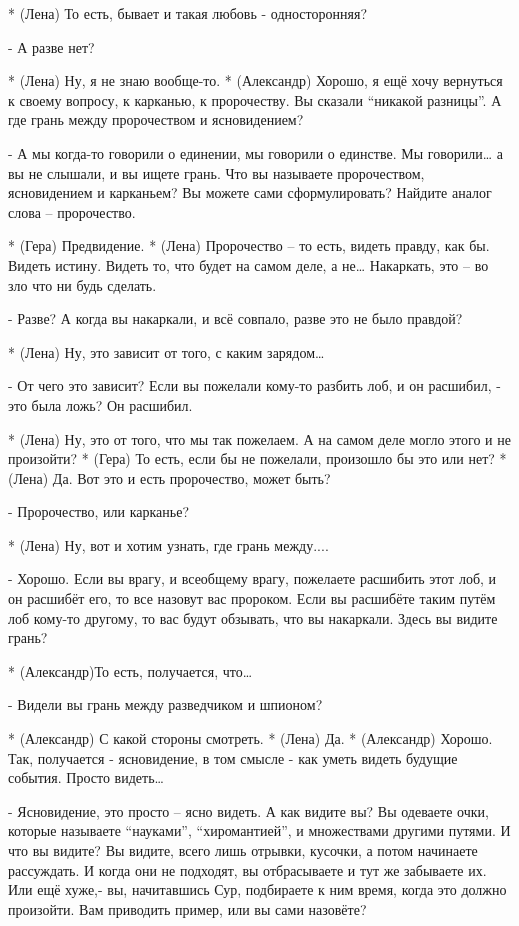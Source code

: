 * (Лена) То есть, бывает и такая любовь - односторонняя?

- А разве нет?

* (Лена) Ну, я не знаю вообще-то.
* (Александр) Хорошо, я ещё хочу вернуться к своему вопросу, к карканью, к пророчеству. Вы сказали “никакой разницы”. А где грань между пророчеством и ясновидением?

- А мы когда-то говорили о единении, мы говорили о единстве. Мы говорили… а вы не слышали, и вы ищете грань. Что вы называете пророчеством, ясновидением и карканьем? Вы можете сами сформулировать? Найдите аналог слова – пророчество.

* (Гера) Предвидение.
* (Лена) Пророчество – то есть, видеть правду, как бы. Видеть истину. Видеть то, что будет на самом деле, а не… Накаркать, это – во зло что ни будь сделать.

- Разве? А когда вы накаркали, и всё совпало, разве это не было правдой?

* (Лена) Ну, это зависит от того, с каким зарядом…

- От чего это зависит? Если вы пожелали кому-то разбить лоб, и он расшибил, - это была ложь? Он расшибил.

* (Лена) Ну, это от того, что мы так пожелаем. А на самом деле могло этого и не произойти?
* (Гера) То есть, если бы не пожелали, произошло бы это или нет?
* (Лена) Да. Вот это и есть пророчество, может быть?

- Пророчество, или карканье?

* (Лена) Ну, вот и хотим узнать, где грань между....

- Хорошо. Если вы врагу, и всеобщему врагу, пожелаете расшибить этот лоб, и он расшибёт его, то все назовут вас пророком. Если вы расшибёте таким путём лоб кому-то другому, то вас будут обзывать, что вы накаркали. Здесь вы видите грань?

* (Александр)То есть, получается, что…

- Видели вы грань между разведчиком и шпионом?

* (Александр) С какой стороны смотреть.
* (Лена) Да.  
* (Александр) Хорошо. Так, получается - ясновидение, в том смысле - как уметь видеть будущие события. Просто видеть…

- Ясновидение, это просто – ясно видеть.  А как видите вы? Вы одеваете очки, которые называете “науками”, “хиромантией”, и множествами другими путями. И что вы видите? Вы видите, всего лишь отрывки, кусочки, а потом начинаете рассуждать. И когда они не подходят, вы отбрасываете и тут же забываете их. Или ещё хуже,- вы, начитавшись Сур, подбираете к ним время, когда это должно произойти. Вам приводить пример, или вы сами назовёте?

